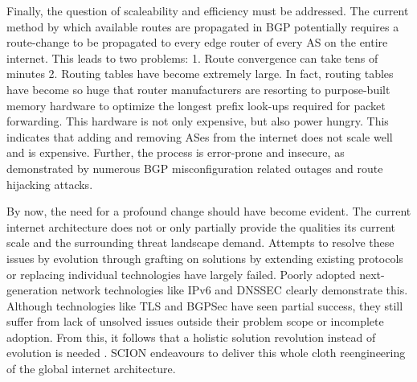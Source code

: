 \documentclass[../eva1_scion.tex]{subfiles}
\begin{document}
    Finally, the question of scaleability and efficiency must be addressed. The current method by which available routes are propagated in BGP potentially requires a route-change to be propagated to every edge router of every AS on the entire internet. This leads to two problems: 1. Route convergence can take tens of minutes \cite{route_convergence} 2. Routing tables have become extremely large. In fact, routing tables have become so huge that router manufacturers are resorting to purpose-built memory hardware to optimize the longest prefix look-ups required for packet forwarding. This hardware is not only expensive, but also power hungry. This indicates that adding and removing ASes from the internet does not scale well and is expensive. Further, the process is error-prone and insecure, as demonstrated by numerous BGP misconfiguration related outages and route hijacking attacks.

    By now, the need for a profound change should have become evident. The current internet architecture does not or only partially provide the qualities its current scale and the surrounding threat landscape demand. Attempts to resolve these issues by evolution through grafting on solutions by extending existing protocols or replacing individual technologies have largely failed. Poorly adopted next-generation network technologies like IPv6 and DNSSEC clearly demonstrate this. Although technologies like TLS and BGPSec have seen partial success, they still suffer from lack of unsolved issues outside their problem scope or incomplete adoption. From this, it follows that a holistic solution \textendash revolution instead of evolution \textendash is needed \cite{xkcd_927}. SCION endeavours to deliver this whole cloth reengineering of the global internet architecture.
\end{document}
